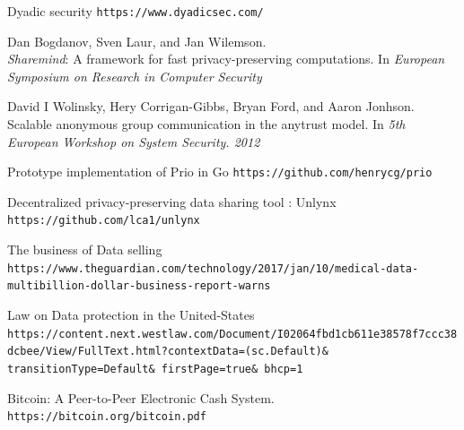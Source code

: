 \documentclass{article}
\begin{document}
\begin{thebibliography}{9}
Dyadic security \texttt{https://www.dyadicsec.com/}

Dan Bogdanov, Sven Laur, and Jan Wilemson.\\
\textit{Sharemind}: A framework for fast privacy-preserving computations. In \textit{European Symposium on Research in Computer Security}

David I Wolinsky, Hery Corrigan-Gibbs, Bryan Ford, and Aaron Jonhson.\\
Scalable anonymous group communication in the anytrust model. In \textit{5th European Workshop on System Security. 2012}


Prototype implementation of Prio in Go
\texttt{https://github.com/henrycg/prio}

Decentralized privacy-preserving data sharing tool : Unlynx\\
\texttt{https://github.com/lca1/unlynx}

The business of Data selling\\
\texttt{https://www.theguardian.com/technology/2017/jan/10/medical-data-multibillion-dollar-business-report-warns}

Law on Data protection in the United-States\\
\texttt{https://content.next.westlaw.com/Document/I02064fbd1cb611e38578f7ccc38dcbee/View/FullText.html?contextData=(sc.Default)\& transitionType=Default\& firstPage=true\& bhcp=1}


Bitcoin: A Peer-to-Peer Electronic Cash System.\\
\texttt{https://bitcoin.org/bitcoin.pdf}



\end{thebibliography}
\end{document}
